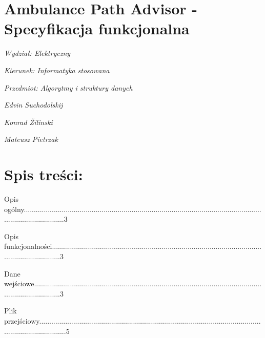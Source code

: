 ﻿\documentclass{article}
\begin{document}
\noindent 

\noindent 

\noindent 

\noindent 

\noindent 

\section{Ambulance Path Advisor -
Specyfikacja funkcjonalna}

\noindent 

\noindent 

\noindent 

\noindent 

\noindent 

\noindent 

\noindent 

\noindent 

\noindent \textit{Wydzia{\l}: Elektryczny}

\noindent \textit{Kierunek: Informatyka stosowana}

\noindent \textit{Przedmiot: Algorytmy i struktury danych}

\noindent \textit{}

\noindent \textit{Edvin Suchodolskij}

\noindent \textit{Konrad \v{Z}ilinski}

\noindent \textit{Mateusz Pietrzak}

\noindent 

\eject

\section{ Spis tre\'{s}ci:}

\noindent 

\noindent Opis og\'{o}lny.....................................................................................................................................................3

\noindent Opis funkcjonalno\'{s}ci.....................................................................................................................................3

\noindent Dane wej\'{s}ciowe..............................................................................................................................................3

\noindent Plik przej\'{s}ciowy..............................................................................................................................................5
\end{document}
